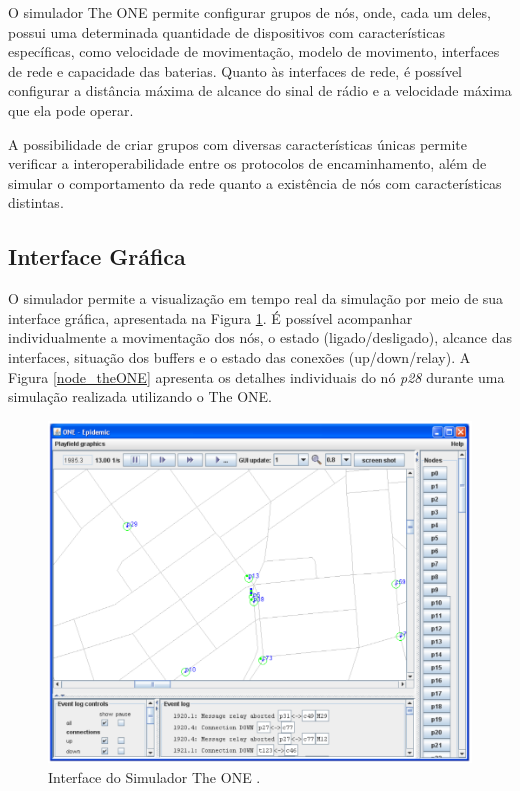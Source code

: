 O simulador The ONE permite configurar grupos de nós, onde, cada um deles, possui uma determinada quantidade de dispositivos com características específicas, como velocidade de movimentação, modelo de movimento, interfaces de rede e capacidade das baterias. Quanto às interfaces de rede, é possível configurar a distância máxima de alcance do sinal de rádio e a velocidade máxima que ela pode operar.

A possibilidade de criar grupos com diversas características únicas permite verificar a interoperabilidade entre os protocolos de encaminhamento, além de simular o comportamento da rede quanto a existência de nós com características distintas.

\subsection{Interface Gráfica}

O simulador permite a visualização em tempo real da simulação por meio de sua interface gráfica, apresentada na Figura \ref{interface_theONE}.  É possível acompanhar individualmente a movimentação dos nós, o estado (ligado/desligado), alcance das interfaces, situação dos buffers e o estado das conexões (up/down/relay). A Figura \ref{node_theONE} apresenta os detalhes individuais do nó \emph{p28} durante uma simulação realizada utilizando o The ONE.

\begin{figure}[htp!]
    \centering
    \includegraphics[width=1\textwidth]{figuras/cap_3/secao_1/interface_theONE.PNG}
    \caption{Interface do Simulador The ONE \cite{keranen2009one}.}
    \label{interface_theONE}
\end{figure}

